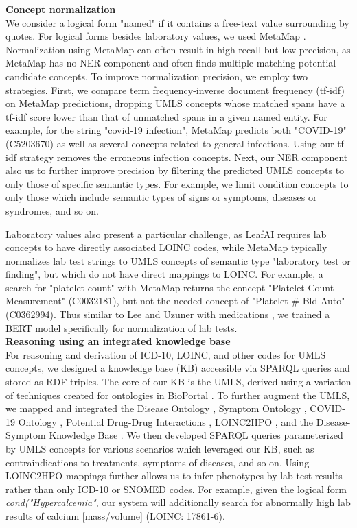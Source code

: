 \documentclass[../main.tex]{subfiles}
\begin{document}
\noindent \textbf{Concept normalization} \\
We consider a logical form "named" if it contains a free-text value surrounding by quotes. For logical forms besides laboratory values, we used MetaMap \cite{aronson2001effective}. Normalization using MetaMap can often result in high recall but low precision, as MetaMap has no NER component and often finds multiple matching potential candidate concepts. To improve normalization precision, we employ two strategies. First, we compare term frequency-inverse document frequency (tf-idf) on MetaMap predictions, dropping UMLS concepts whose matched spans have a tf-idf score lower than that of unmatched spans in a given named entity. For example, for the string "covid-19 infection", MetaMap predicts both "COVID-19" (C5203670) as well as several concepts related to general infections. Using our tf-idf strategy removes the erroneous infection concepts. Next, our NER component also us to further improve precision by filtering the predicted UMLS concepts to only those of specific semantic types. For example, we limit condition concepts to only those which include semantic types of signs or symptoms, diseases or syndromes, and so on. 

Laboratory values also present a particular challenge, as LeafAI requires lab concepts to have directly associated LOINC codes, while MetaMap typically normalizes lab test strings to UMLS concepts of semantic type "laboratory test or finding", but which do not have direct mappings to LOINC. For example, a search for "platelet count" with MetaMap returns the concept "Platelet Count Measurement" (C0032181), but not the needed concept of "Platelet \# Bld Auto" (C0362994). Thus similar to Lee and Uzuner with medications \cite{lee2020normalizing}, we trained a BERT model specifically for normalization of lab tests. \\

\noindent \textbf{Reasoning using an integrated knowledge base} \\
\noindent For reasoning and derivation of ICD-10, LOINC, and other codes for UMLS concepts, we designed a knowledge base (KB) accessible via SPARQL queries and stored as RDF triples. The core of our KB is the UMLS, derived using a variation of techniques created for ontologies in BioPortal \cite{noy2009bioportal}. To further augment the UMLS, we mapped and integrated the Disease Ontology \cite{schriml2012disease}, Symptom Ontology \cite{sayers2010database}, COVID-19 Ontology \cite{sargsyan2020covid}, Potential Drug-Drug Interactions \cite{ayvaz2015toward}, LOINC2HPO \cite{zhang2019semantic}, and the Disease-Symptom Knowledge Base \cite{wang2008automated}. We then developed SPARQL queries parameterized by UMLS concepts for various scenarios which leveraged our KB, such as contraindications to treatments, symptoms of diseases, and so on. Using LOINC2HPO mappings further allows us to infer phenotypes by lab test results rather than only ICD-10 or SNOMED codes. For example, given the logical form \textit{cond("Hypercalcemia"}, our system will additionally search for abnormally high lab results of calcium [mass/volume] (LOINC: 17861-6).
\end{document}

